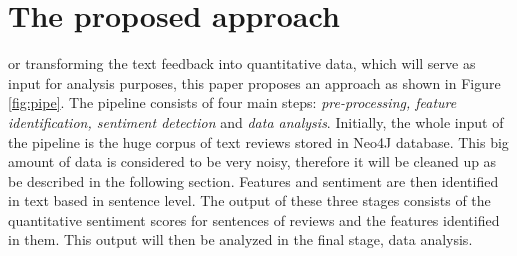 
%
%
\let\textcircled=\pgftextcircled
\chapter{The proposed approach}
\label{chap:prop}

or transforming the text feedback into quantitative data, which will serve as input for analysis purposes, this paper proposes an approach as shown in Figure \ref{fig:pipe}. The pipeline consists of four main steps: \textit{pre-processing, feature identification, sentiment detection}  and \textit{data analysis}. Initially, the whole input of the pipeline is the huge corpus of text reviews stored in Neo4J database. This big amount of data is considered to be very noisy, therefore it will be cleaned up as be described in the following section. Features and sentiment are then identified in text based in sentence level. The output of these three stages consists of the quantitative sentiment scores for sentences of reviews and the features identified in them. This output will then be analyzed in the final stage, data analysis.  
%
%
%
